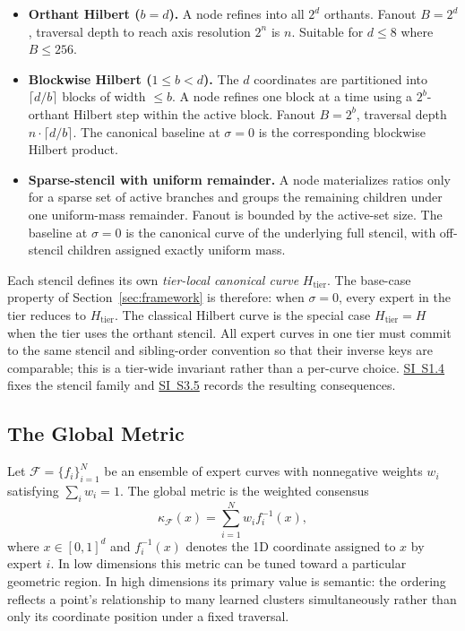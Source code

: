 \documentclass[11pt]{article}
\newcommand{\kappaf}{\kappa_{\mathcal F}}
\begin{document}
\begin{itemize}[leftmargin=1.5em]
    \item \textbf{Orthant Hilbert ($b=d$).} A node refines into all $2^d$ orthants. Fanout $B=2^d$, traversal depth to reach axis resolution $2^n$ is $n$. Suitable for $d\leq 8$ where $B\leq 256$.
    \item \textbf{Blockwise Hilbert ($1\leq b<d$).} The $d$ coordinates are partitioned into $\lceil d/b\rceil$ blocks of width $\leq b$. A node refines one block at a time using a $2^b$-orthant Hilbert step within the active block. Fanout $B=2^b$, traversal depth $n\cdot\lceil d/b\rceil$. The canonical baseline at $\sigma=0$ is the corresponding blockwise Hilbert product.
    \item \textbf{Sparse-stencil with uniform remainder.} A node materializes ratios only for a sparse set of active branches and groups the remaining children under one uniform-mass remainder. Fanout is bounded by the active-set size. The baseline at $\sigma=0$ is the canonical curve of the underlying full stencil, with off-stencil children assigned exactly uniform mass.
\end{itemize}

Each stencil defines its own \emph{tier-local canonical curve} $H_{\mathrm{tier}}$. The base-case property of Section~\ref{sec:framework} is therefore: when $\sigma=0$, every expert in the tier reduces to $H_{\mathrm{tier}}$. The classical Hilbert curve is the special case $H_{\mathrm{tier}}=H$ when the tier uses the orthant stencil. All expert curves in one tier must commit to the same stencil and sibling-order convention so that their inverse keys are comparable; this is a tier-wide invariant rather than a per-curve choice. \hyperref[sec:si-stencils]{SI~S1.4} fixes the stencil family and \hyperref[sec:si-stencil-invariants]{SI~S3.5} records the resulting consequences.

\subsection{The Global Metric}
Let $\mathcal F=\{f_i\}_{i=1}^N$ be an ensemble of expert curves with nonnegative weights $w_i$ satisfying $\sum_i w_i=1$. The global metric is the weighted consensus
\begin{equation}
\kappaf(x)=\sum_{i=1}^N w_i f_i^{-1}(x),
\label{eq:global-metric}
\end{equation}
where $x\in[0,1]^d$ and $f_i^{-1}(x)$ denotes the 1D coordinate assigned to $x$ by expert $i$. In low dimensions this metric can be tuned toward a particular geometric region. In high dimensions its primary value is semantic: the ordering reflects a point's relationship to many learned clusters simultaneously rather than only its coordinate position under a fixed traversal.
\end{document}
